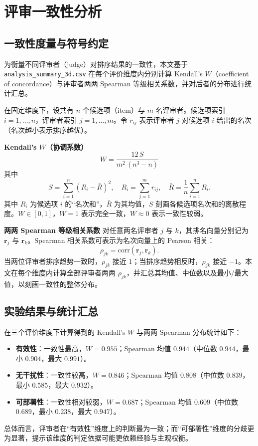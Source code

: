 \section{评审一致性分析}

\subsection{一致性度量与符号约定}
为衡量不同评审者（judge）对排序结果的一致性，本文基于 \texttt{analysis\_summary\_3d.csv} 在每个评价维度内分别计算 Kendall’s $W$（coefficient of concordance）与评审者两两 Spearman 等级相关系数，并对后者的分布进行统计汇总。

在固定维度下，设共有 $n$ 个候选项（item）与 $m$ 名评审者。候选项索引 $i=1,\dots,n$，评审者索引 $j=1,\dots,m$。令 $r_{ij}$ 表示评审者 $j$ 对候选项 $i$ 给出的名次（名次越小表示排序越优）。

\textbf{Kendall’s $W$（协调系数）}
\begin{equation}
W = \frac{12\,S}{m^2\,(n^3-n)}
\end{equation}
其中
\begin{equation}
S=\sum_{i=1}^{n}(R_i-\bar{R})^2,\quad R_i=\sum_{j=1}^{m} r_{ij},\quad \bar{R}=\frac{1}{n}\sum_{i=1}^{n}R_i.
\end{equation}
其中 $R_i$ 为候选项 $i$ 的“名次和”，$\bar{R}$ 为其均值，$S$ 刻画各候选项名次和的离散程度。$W\in[0,1]$，$W=1$ 表示完全一致，$W\approx 0$ 表示一致性较弱。

\textbf{两两 Spearman 等级相关系数}
对任意两名评审者 $j$ 与 $k$，其排名向量分别记为 $\mathbf{r}_j$ 与 $\mathbf{r}_k$。Spearman 相关系数可表示为名次向量上的 Pearson 相关：
\begin{equation}
\rho_{jk}=\mathrm{corr}(\mathbf{r}_j,\mathbf{r}_k).
\end{equation}
当两位评审者排序趋势一致时，$\rho_{jk}$ 接近 $1$；当排序趋势相反时，$\rho_{jk}$ 接近 $-1$。本文在每个维度内计算全部评审者两两 $\rho_{jk}$，并汇总其均值、中位数以及最小/最大值，以刻画一致性的整体分布。

\subsection{实验结果与统计汇总}
在三个评价维度下计算得到的 Kendall’s $W$ 与两两 Spearman 分布统计如下：
\begin{itemize}
	\item \textbf{有效性}：一致性最高，$W=0.955$；Spearman 均值 $0.944$（中位数 $0.944$，最小 $0.904$，最大 $0.991$）。
	\item \textbf{无干扰性}：一致性较高，$W=0.846$；Spearman 均值 $0.808$（中位数 $0.839$，最小 $0.585$，最大 $0.932$）。
	\item \textbf{可部署性}：一致性相对较弱，$W=0.687$；Spearman 均值 $0.609$（中位数 $0.689$，最小 $0.238$，最大 $0.947$）。
\end{itemize}
总体而言，评审者在“有效性”维度上的判断最为一致；而“可部署性”维度的分歧更为显著，提示该维度的判定依据可能更依赖经验与主观权衡。

